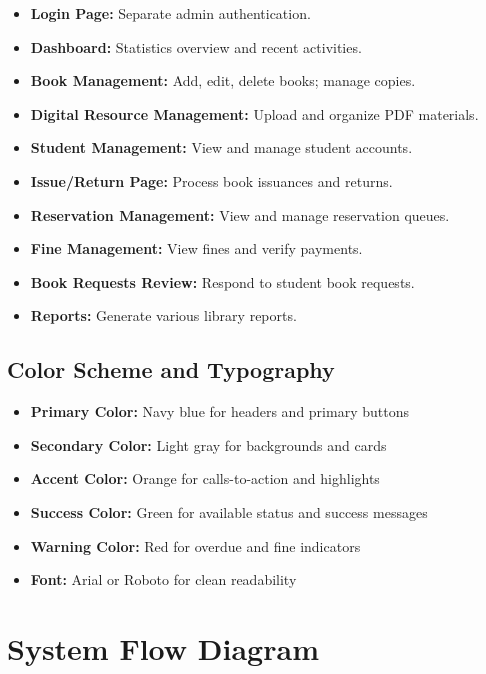 \documentclass[12pt,a4paper]{report}
\begin{document}
\begin{itemize}
    \item \textbf{Login Page:} Separate admin authentication.
    \item \textbf{Dashboard:} Statistics overview and recent activities.
    \item \textbf{Book Management:} Add, edit, delete books; manage copies.
    \item \textbf{Digital Resource Management:} Upload and organize PDF materials.
    \item \textbf{Student Management:} View and manage student accounts.
    \item \textbf{Issue/Return Page:} Process book issuances and returns.
    \item \textbf{Reservation Management:} View and manage reservation queues.
    \item \textbf{Fine Management:} View fines and verify payments.
    \item \textbf{Book Requests Review:} Respond to student book requests.
    \item \textbf{Reports:} Generate various library reports.
\end{itemize}

\subsection{Color Scheme and Typography}

\begin{itemize}
    \item \textbf{Primary Color:} Navy blue for headers and primary buttons
    \item \textbf{Secondary Color:} Light gray for backgrounds and cards
    \item \textbf{Accent Color:} Orange for calls-to-action and highlights
    \item \textbf{Success Color:} Green for available status and success messages
    \item \textbf{Warning Color:} Red for overdue and fine indicators
    \item \textbf{Font:} Arial or Roboto for clean readability
\end{itemize}

\section{System Flow Diagram}
\label{sec:systemflow}
\end{document}
